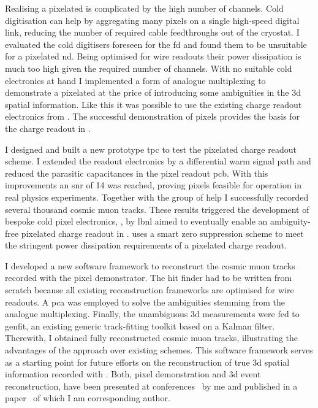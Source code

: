 Realising a pixelated \lartpc{} is complicated by the high number of channels.
Cold digitisation can help by aggregating many pixels on a single high-speed digital link, reducing the number of required cable feedthroughs out of the cryostat.
I evaluated the cold digitisers foreseen for the \dune{} \gls{fd} and found them to be unsuitable for a pixelated \gls{nd}.
Being optimised for wire readouts their power dissipation is much too high given the required number of channels.
With no suitable cold electronics at hand I implemented a form of analogue multiplexing to demonstrate a pixelated \lartpc{} at the price of introducing some ambiguities in the \gls{3d} spatial information.
Like this it was possible to use the existing charge readout electronics from \AT{}.
The successful demonstration of pixels provides the basis for the charge readout in \AC{}.

I designed and built a new prototype \gls{tpc} to test the pixelated charge readout scheme.
I extended the \AT{} readout electronics by a differential warm signal path and reduced the parasitic capacitances in the pixel readout \gls{pcb}.
With this improvements an \gls{snr} of \num{14} was reached, proving pixels feasible for operation in real physics experiments.
Together with the \lar{} group of \gls{help} I successfully recorded several thousand cosmic muon tracks.
These results triggered the development of bespoke cold pixel electronics, \larpix{}, by \gls{lbnl} aimed to eventually enable an ambiguity-free pixelated charge readout in \AC{}.
\larpix{} uses a smart zero suppression scheme to meet the stringent power dissipation requirements of a pixelated charge readout.

I developed a new software framework to reconstruct the cosmic muon tracks recorded with the pixel demonstrator.
The hit finder had to be written from scratch because all existing \lartpc{} reconstruction frameworks are optimised for wire readouts.
A \gls{pca} was employed to solve the ambiguities stemming from the analogue multiplexing.
Finally, the unambiguous \gls{3d} measurements were fed to \gls{genfit}, an existing generic track-fitting toolkit based on a Kalman filter.
Therewith, I obtained fully reconstructed cosmic muon tracks, illustrating the advantages of the \AC{} approach over existing schemes.
This software framework serves as a starting point for future efforts on the reconstruction of true \gls{3d} spatial information recorded with \AC{}.
Both, pixel demonstration and \gls{3d} event reconstruction, have been presented at conferences~\cite{pixel_proceedings} by me and published in a paper~\cite{pixel_paper} of which I am corresponding author.

